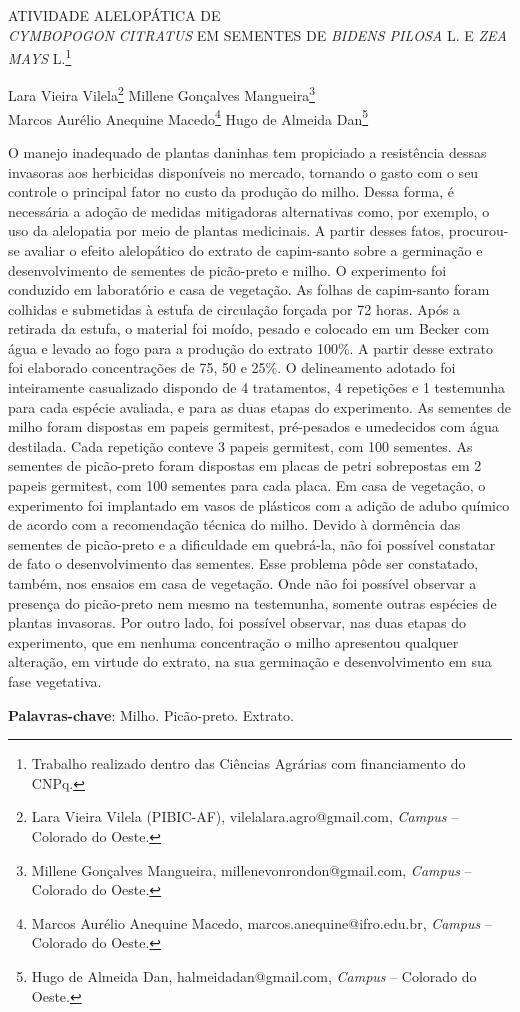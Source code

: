 \documentclass[article,12pt,onesidea,4paper,english,brazil]{abntex2}
\begin{document}
	
	
	\frenchspacing 
	
	\begin{center}
		\LARGE ATIVIDADE ALELOPÁTICA DE \\\textit{CYMBOPOGON CITRATUS} EM SEMENTES DE \textit{BIDENS PILOSA} L. E \textit{ZEA MAYS} L.\footnote{Trabalho realizado dentro das Ciências Agrárias com financiamento do CNPq.}
		
		\normalsize
		Lara Vieira Vilela\footnote{Lara Vieira Vilela (PIBIC-AF), vilelalara.agro@gmail.com, \textit{Campus} – Colorado do Oeste.} 
		Millene Gonçalves Mangueira\footnote{Millene Gonçalves Mangueira, millenevonrondon@gmail.com, \textit{Campus} – Colorado do Oeste.}\\ 
		Marcos Aurélio Anequine Macedo\footnote{Marcos Aurélio Anequine Macedo, marcos.anequine@ifro.edu.br, \textit{Campus} – Colorado do Oeste.} 
		Hugo de Almeida Dan\footnote{Hugo de Almeida Dan, halmeidadan@gmail.com, \textit{Campus} – Colorado do Oeste.} 
	\end{center}
	
	\noindent O manejo inadequado de plantas daninhas tem propiciado a resistência dessas
	invasoras aos herbicidas disponíveis no mercado, tornando o gasto com o seu
	controle o principal fator no custo da produção do milho. Dessa forma, é necessária
	a adoção de medidas mitigadoras alternativas como, por exemplo, o uso da
	alelopatia por meio de plantas medicinais. A partir desses fatos, procurou-se avaliar
	o efeito alelopático do extrato de capim-santo sobre a germinação e
	desenvolvimento de sementes de picão-preto e milho. O experimento foi conduzido
	em laboratório e casa de vegetação. As folhas de capim-santo foram colhidas e
	submetidas à estufa de circulação forçada por 72 horas. Após a retirada da estufa, o
	material foi moído, pesado e colocado em um Becker com água e levado ao fogo
	para a produção do extrato 100\%. A partir desse extrato foi elaborado concentrações
	de 75, 50 e 25\%. O delineamento adotado foi inteiramente casualizado dispondo de
	4 tratamentos, 4 repetições e 1 testemunha para cada espécie avaliada, e para as
	duas etapas do experimento. As sementes de milho foram dispostas em papeis
	germitest, pré-pesados e umedecidos com água destilada. Cada repetição conteve 3
	papeis germitest, com 100 sementes. As sementes de picão-preto foram dispostas
	em placas de petri sobrepostas em 2 papeis germitest, com 100 sementes para cada
	placa. Em casa de vegetação, o experimento foi implantado em vasos de plásticos
	com a adição de adubo químico de acordo com a recomendação técnica do milho.
	Devido à dormência das sementes de picão-preto e a dificuldade em quebrá-la, não
	foi possível constatar de fato o desenvolvimento das sementes. Esse problema pôde
	ser constatado, também, nos ensaios em casa de vegetação. Onde não foi possível
	observar a presença do picão-preto nem mesmo na testemunha, somente outras
	espécies de plantas invasoras. Por outro lado, foi possível observar, nas duas
	etapas do experimento, que em nenhuma concentração o milho apresentou qualquer
	alteração, em virtude do extrato, na sua germinação e desenvolvimento em sua fase
	vegetativa.
	
	\vspace{\onelineskip}
	
	\noindent
	\textbf{Palavras-chave}: Milho. Picão-preto. Extrato.
	
\end{document}
